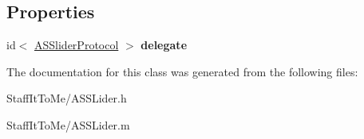\subsection*{\-Properties}
\begin{DoxyCompactItemize}
\item 
\hypertarget{interface_a_s_s_lider_a15758b42e2f4a58c04d63fce03b3fe56}{
id$<$ \hyperlink{protocol_a_s_slider_protocol-p}{\-A\-S\-Slider\-Protocol} $>$ {\bfseries delegate}}
\label{interface_a_s_s_lider_a15758b42e2f4a58c04d63fce03b3fe56}

\end{DoxyCompactItemize}


\-The documentation for this class was generated from the following files\-:\begin{DoxyCompactItemize}
\item 
\-Staff\-It\-To\-Me/\-A\-S\-S\-Lider.\-h\item 
\-Staff\-It\-To\-Me/\-A\-S\-S\-Lider.\-m\end{DoxyCompactItemize}
